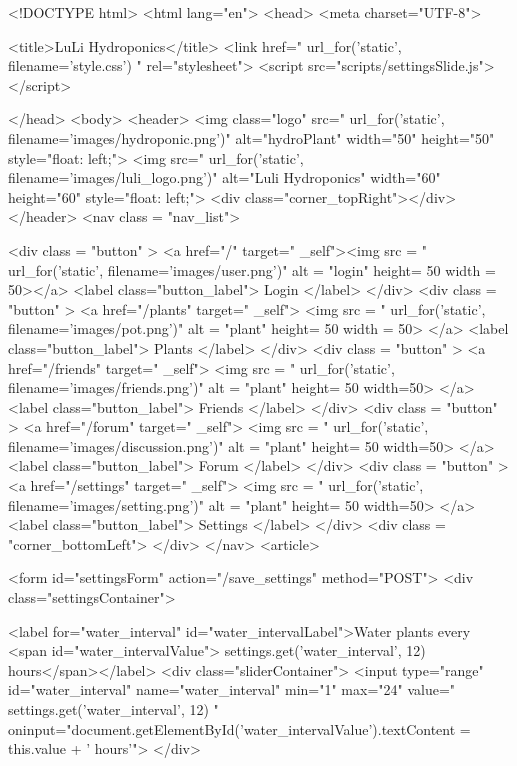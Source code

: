 \documentclass[12pt]{article} %
\begin{document}
\begin{htmlcode}[caption={Settings Page HTML}]
<!DOCTYPE html>
<html lang="en">
<head>
<meta charset="UTF-8">

<title>LuLi Hydroponics</title>
<link href="{{ url_for('static', filename='style.css') }}" rel="stylesheet">
<script src="scripts/settingsSlide.js"></script>

</head>
<body>
<header>
    <img class="logo" src="{{ url_for('static', filename='images/hydroponic.png')}}" alt="hydroPlant" width="50" height="50" style="float: left;">
    <img src="{{ url_for('static', filename='images/luli_logo.png')}}" alt="Luli Hydroponics" width="60" height="60" style="float: left;">
    <div class="corner_topRight"></div>
</header>
<nav class = "nav_list">
      
    <div class = "button" > 
       <a href="/" target=" _self"><img src = "{{ url_for('static', filename='images/user.png')}}" alt = "login" height= 50 width = 50></a>
       <label class="button_label"> Login </label> 
    </div>
    <div class = "button" > 
       <a href="/plants" target=" _self"> <img src = "{{ url_for('static', filename='images/pot.png')}}" alt = "plant" height= 50 width = 50> </a>
       <label class="button_label"> Plants </label> 
    </div>
    <div class = "button" > 
       <a href="/friends" target=" _self"> <img src = "{{ url_for('static', filename='images/friends.png')}}" alt = "plant" height= 50 width=50> </a>
       <label class="button_label"> Friends </label> 
    </div>
    <div class = "button" > 
       <a href="/forum" target=" _self"> <img src = "{{ url_for('static', filename='images/discussion.png')}}" alt = "plant" height= 50 width=50> </a>
       <label class="button_label"> Forum </label> 
    </div>
    <div class = "button" > 
       <a href="/settings" target=" _self"> <img src = "{{ url_for('static', filename='images/setting.png')}}" alt = "plant" height= 50 width=50> </a>
       <label class="button_label"> Settings </label> 
    </div>
       <div class = "corner_bottomLeft"> </div>
   </nav>
<article>

    <form id="settingsForm" action="/save_settings" method="POST">
        <div class="settingsContainer">
            
            <label for="water_interval" id="water_intervalLabel">Water plants every <span id="water_intervalValue">{{ settings.get('water_interval', 12) }} hours</span></label>
            <div class="sliderContainer">
                <input type="range" id="water_interval" name="water_interval" min="1" max="24" value="{{ settings.get('water_interval', 12) }}" oninput="document.getElementById('water_intervalValue').textContent = this.value + ' hours'">
            </div>
    

\end{htmlcode}
\end{document}
